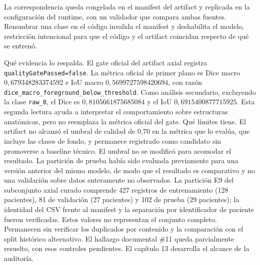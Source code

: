La correspondencia queda congelada en el manifest del artifact y replicada en la configuración del runtime, con un validador que compara ambas fuentes. Renombrar una clase en el código invalida el manifest y deshabilita el modelo, restricción intencional para que el código y el artifact coincidan respecto de qué se entrenó.

\label{fig:cap11-workspace-axial}
Qué evidencia lo respalda. El gate oficial del artifact axial registra \texttt{qualityGatePassed=false}. La métrica oficial de primer plano es Dice macro \(0{,}679348283374592\) e IoU macro \(0{,}5699727598420694\), con razón \texttt{dice\_macro\_foreground\_below\_threshold}. Como análisis secundario, excluyendo la clase \texttt{raw\_0}, el Dice es \(0{,}8105661875685084\) y el IoU \(0{,}6915400877715925\). Esta segunda lectura ayuda a interpretar el comportamiento sobre estructuras anatómicas, pero no reemplaza la métrica oficial del gate.
Qué límites tiene. El artifact no alcanzó el umbral de calidad de 0,70 en la métrica que lo evalúa, que incluye las clases de fondo, y permanece registrado como candidato sin promoverse a baseline técnico. El umbral no se modificó para acomodar el resultado. La partición de prueba había sido evaluada previamente para una versión anterior del mismo modelo, de modo que el resultado es comparativo y no una validación sobre datos enteramente no observados. La partición E9 del subconjunto axial curado comprende 427 registros de entrenamiento (128 pacientes), 81 de validación (27 pacientes) y 102 de prueba (29 pacientes); la identidad del CSV frente al manifest y la separación por identificador de paciente fueron verificadas. Estos valores no representan el conjunto completo. Permanecen sin verificar los duplicados por contenido y la comparación con el split histórico alternativo. El hallazgo documental \#11 queda parcialmente resuelto, con esos controles pendientes. El capítulo 13 desarrolla el alcance de la auditoría.

